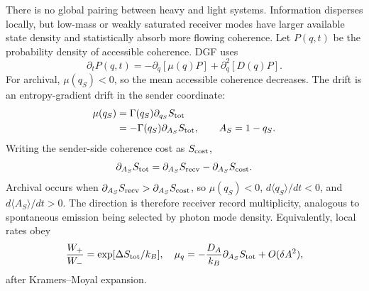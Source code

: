 \documentclass[aps,prl,twocolumn,superscriptaddress,nofootinbib,floatfix]{revtex4-2}
\begin{document}
There is no global pairing between heavy and light systems. Information disperses locally, but low-mass or weakly saturated receiver modes have larger available state density and statistically absorb more flowing coherence. Let $P(q,t)$ be the probability density of accessible coherence. DGF uses
\begin{equation}
\boxed{
\partial_tP(q,t)
=-\partial_q[\mu(q)P]+\partial_q^2[D(q)P].
}
\end{equation}
For archival, $\mu(q_S)<0$, so the mean accessible coherence decreases. The drift is an entropy-gradient drift in the sender coordinate:
\begin{align}
\mu(q_S)&=\Gamma(q_S)\partial_{q_S}S_{\rm tot}\nonumber\\
&=-\Gamma(q_S)\partial_{A_S}S_{\rm tot},
\qquad A_S=1-q_S .
\end{align}
Writing the sender-side coherence cost as $S_{\rm cost}$,
\begin{equation}
\partial_{A_S}S_{\rm tot}
=\partial_{A_S}S_{\rm recv}-\partial_{A_S}S_{\rm cost}.
\end{equation}
Archival occurs when $\partial_{A_S}S_{\rm recv}>\partial_{A_S}S_{\rm cost}$, so $\mu(q_S)<0$, $d\langle q_S\rangle/dt<0$, and $d\langle A_S\rangle/dt>0$. The direction is therefore receiver record multiplicity, analogous to spontaneous emission being selected by photon mode density.
Equivalently, local rates obey
\begin{equation}
\frac{W_+}{W_-}=\exp[\Delta S_{\rm tot}/k_B],
\quad
\mu_q=-\frac{D_A}{k_B}\partial_{A_S}S_{\rm tot}+O(\delta A^2),
\end{equation}
after Kramers--Moyal expansion.
\end{document}
